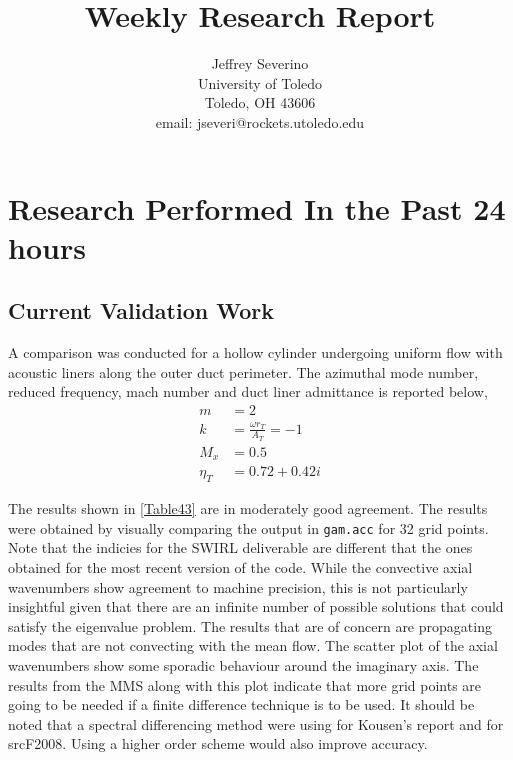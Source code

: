 \documentclass[a4paper]{article}
\begin{document}
\begin{titlepage}

    \title{
    Weekly Research Report}


    \author{ Jeffrey Severino \\
        University of Toledo \\
        Toledo, OH  43606 \\
    email: jseveri@rockets.utoledo.edu}


    \maketitle

\end{titlepage}

\section{Research Performed In the Past 24 hours}
\subsection{Current Validation Work}

A comparison was conducted for a hollow cylinder undergoing uniform flow with
acoustic liners along the outer duct perimeter. The azimuthal mode number, reduced 
frequency, mach number and duct liner admittance is reported below,
\begin{align*}
    m &= 2 \\
    k &= \frac{\omega r_T}{A_T} = -1 \\
    M_x &= 0.5 \\
    \eta_T &= 0.72 + 0.42i
\end{align*} 
%






The results shown in \ref{Table43} are in moderately good agreement. The 
results were obtained by visually comparing the output in \verb|gam.acc| for 32 
grid points. Note that the indicies for the SWIRL deliverable are different that 
the ones obtained for the most recent version of the code. While the 
convective axial wavenumbers show agreement to machine precision, this is not 
particularly insightful given that there are an infinite number of possible solutions 
that could satisfy the eigenvalue problem. The results that are of concern 
are propagating modes that are not convecting with the mean flow.  The scatter plot
of the axial wavenumbers show some sporadic behaviour around the imaginary axis.
The results from the MMS along with this plot indicate that more grid points are going 
to be needed if a finite difference technique is to be used. It should be 
noted that a spectral differencing method were using for Kousen's report and for
srcF2008. Using a higher order scheme would also improve accuracy.
\end{document}
